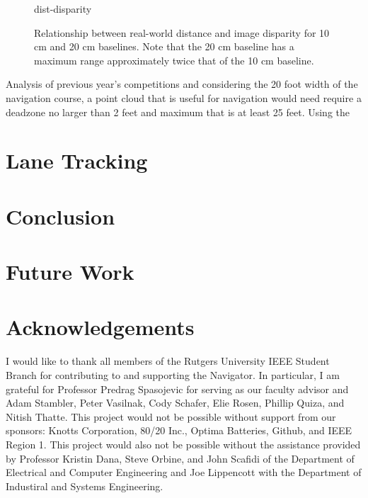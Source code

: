 \documentclass[11pt,twocolumn]{article}
\begin{document}
\begin{figure}
	{dist-disparity}
	\caption{
		Relationship between real-world distance and image disparity for
		10 cm and 20 cm baselines. Note that the 20 cm baseline has a maximum
		range approximately twice that of the 10 cm baseline.
	}
	\label{fig:stereo-dist-disparity}
\end{figure}

Analysis of previous year's competitions and considering the 20 foot width of
the navigation course, a point cloud that is useful for navigation would need
require a deadzone no larger than 2 feet and maximum that is at least 25 feet. Using the


\section{Lane Tracking}
\label{sec:lane}

\section{Conclusion}
\label{sec:conclusion}

\section{Future Work}
\label{sec:future}

\section{Acknowledgements}
I would like to thank all members of the Rutgers University IEEE Student Branch
for contributing to and supporting the Navigator. In particular, I am grateful
for Professor Predrag Spasojevic for serving as our faculty advisor and Adam
Stambler, Peter Vasilnak, Cody Schafer, Elie Rosen, Phillip Quiza, and Nitish
Thatte. This project would not be possible without support from our sponsors:
Knotts Corporation, 80/20 Inc., Optima Batteries, Github, and IEEE Region 1.
This project would also not be possible without the assistance provided by
Professor Kristin Dana, Steve Orbine, and John Scafidi of the Department of
Electrical and Computer Engineering and Joe Lippencott with the Department of
Industiral and Systems Engineering.
\end{document}

